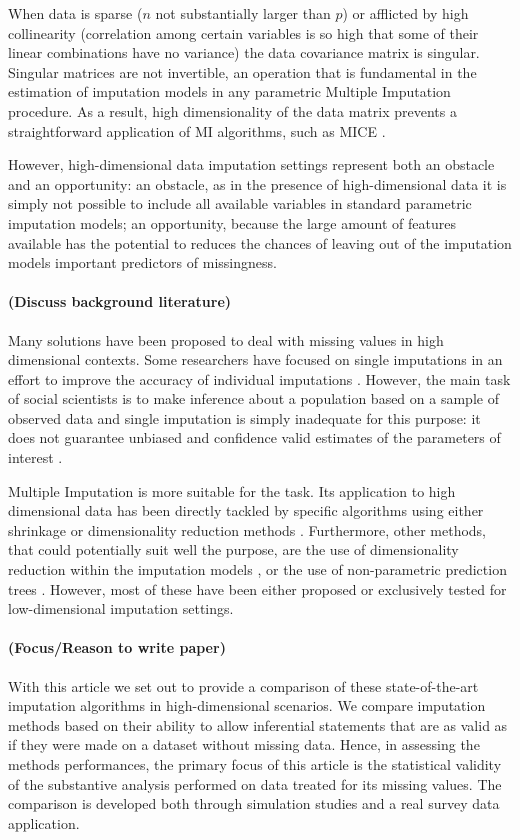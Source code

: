 When data is sparse ($n$ not substantially larger than $p$) or afflicted by high collinearity (correlation among 
certain variables is so high that some of their linear combinations have no variance) the data covariance matrix
is singular. 
Singular matrices are not invertible, an operation that is fundamental in the estimation of imputation models in 
any parametric Multiple Imputation procedure.
As a result, high dimensionality of the data matrix prevents a straightforward application of MI algorithms, 
such as MICE \citep{vanBuuren:2012}.

However, high-dimensional data imputation settings represent both an obstacle and an opportunity: an 
obstacle, as in the presence of high-dimensional data it is simply not possible to include all available variables 
in standard parametric imputation models; 
an opportunity, because the large amount of features available has the potential to reduces the chances of 
leaving out of the imputation models important predictors of missingness.

\paragraph{(Discuss background literature)}
Many solutions have been proposed to deal with missing values in high dimensional contexts. Some researchers
have focused on single imputations in an effort to improve the accuracy of individual imputations \citep{kimEtAl:2005, 
stekhovenBuhlmann:2011, d'ambrosioEtAl:2012}. 
However, the main task of social scientists is to make inference about a population based on a sample of observed 
data and single imputation is simply inadequate for this purpose: it does not guarantee unbiased and confidence 
valid estimates of the parameters of interest \citep{rubin:1996}.

Multiple Imputation is more suitable for the task. Its application to high dimensional data has been directly tackled 
by specific algorithms using either shrinkage or dimensionality reduction methods
\citep{songBelin:2004, zhaoLong:2016, dengEtAl:2016}. 
Furthermore, other methods, that could potentially suit well the purpose, are the use of dimensionality reduction
within the imputation models \citep{howardEtAl:2015}, or the use of non-parametric prediction trees 
\citep{burgetteReiter:2010, dooveEtAl:2014}.
However, most of these have been either proposed or exclusively tested for low-dimensional imputation 
settings.

\paragraph{(Focus/Reason to write paper)}
With this article we set out to provide a comparison of these state-of-the-art imputation algorithms in 
high-dimensional scenarios. 
We compare imputation methods based on their ability to allow inferential statements that are as valid as 
if they were made on a dataset without missing data.
Hence, in assessing the methods performances, the primary focus of this article is the statistical validity
\citep{rubin:1996} of the substantive analysis performed on data treated for its missing values.
The comparison is developed both through simulation studies and a real survey data application.

